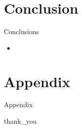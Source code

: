 \section{Conclusion}

\begin{frame}{Conclusions}
    \begin{itemize}
        \item
    \end{itemize}
\end{frame}

\section{Appendix}

\begin{frame}{Appendix}

\end{frame}

{
{thank_you}
\begin{frame}[plain]
\end{frame}
}

